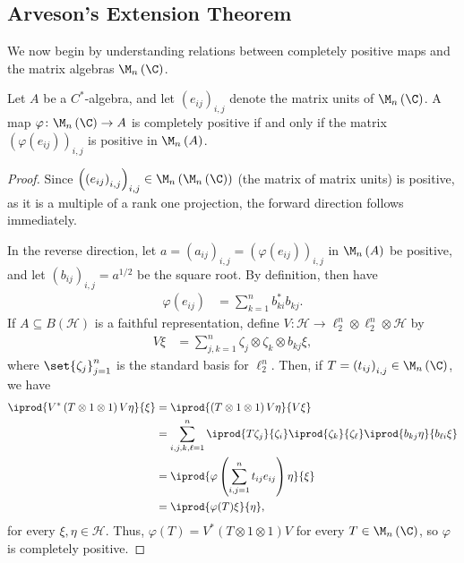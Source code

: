 \documentclass[10pt]{mypackage}
\begin{document}
\subsection{Arveson's Extension Theorem}%
We now begin by understanding relations between completely positive maps and the matrix algebras $\M_n\left( \C \right)$.
\begin{proposition}
  Let $A$ be a $C^{\ast}$-algebra, and let $\left( e_{ij} \right)_{i,j}$ denote the matrix units of $\M_n\left( \C \right)$. A map $\varphi\colon \M_n\left( \C \right)\rightarrow A$ is completely positive if and only if the matrix $\left( \varphi\left( e_{ij} \right) \right)_{i,j}$ is positive in $\M_n\left( A \right)$.
\end{proposition}
\begin{proof}
  Since $\left( \left( e_{ij} \right)_{i,j} \right)_{i,j}\in \M_n\left( \M_n\left( \C \right) \right)$ (the matrix of matrix units) is positive, as it is a multiple of a rank one projection, the forward direction follows immediately.

  In the reverse direction, let $a = \left( a_{ij} \right)_{i,j} = \left( \varphi\left( e_{ij} \right) \right)_{i,j}$ in $\M_n\left( A \right)$ be positive, and let $\left( b_{ij} \right)_{i,j} = a^{1/2}$ be the square root. By definition, then have
  \begin{align*}
    \varphi\left( e_{ij} \right) &= \sum_{k=1}^{n}b_{ki}^{\ast}b_{kj}.
  \end{align*}
  If $A\subseteq B\left( \mathcal{H} \right)$ is a faithful representation, define $V\colon \mathcal{H}\rightarrow \ell_2^n\otimes \ell_2^n\otimes \mathcal{H}$ by
  \begin{align*}
    V\xi &= \sum_{j,k=1}^{n}\zeta_j\otimes\zeta_k\otimes b_{kj}\xi,
  \end{align*}
  where $\set{\zeta_j}_{j=1}^{n}$ is the standard basis for $\ell_2^n$. Then, if $T = \left( t_{ij} \right)_{i,j}\in \M_n\left( \C \right)$, we have
  \begin{align*}
    \iprod{V^{\ast}\left( T\otimes 1 \otimes 1 \right)V\eta}{\xi} &= \iprod{\left( T\otimes1\otimes 1 \right)V\eta}{V\xi}\\
                                                                  &= \sum_{i,j,k,\ell=1}^{n} \iprod{T\zeta_j}{\zeta_i} \iprod{\zeta_k}{\zeta_{\ell}} \iprod{b_{kj}\eta}{b_{\ell i}\xi}\\
                                                                  &= \iprod{\varphi\left( \sum_{i,j=1}^{n}t_{ij}e_{ij} \right)\eta}{\xi}\\
                                                                  &= \iprod{\varphi(T)\xi}{\eta},
  \end{align*}
  for every $\xi,\eta\in \mathcal{H}$. Thus, $\varphi\left( T \right) = V^{\ast}\left( T\otimes1\otimes 1 \right)V$ for every $T\in \M_n\left( \C \right)$, so $\varphi$ is completely positive.
\end{proof}
\end{document}
